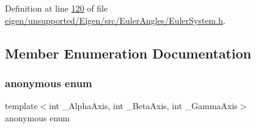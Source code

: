 Definition at line \hyperlink{eigen_2unsupported_2_eigen_2src_2_euler_angles_2_euler_system_8h_source_l00120}{120} of file \hyperlink{eigen_2unsupported_2_eigen_2src_2_euler_angles_2_euler_system_8h_source}{eigen/unsupported/\+Eigen/src/\+Euler\+Angles/\+Euler\+System.\+h}.



\subsection{Member Enumeration Documentation}
\mbox{\label{class_eigen_1_1_euler_system_ab1604e0e8eb9b72fa937236fdb9fd68d}} 
\subsubsection{\texorpdfstring{anonymous enum}{anonymous enum}}
{\footnotesize\ttfamily template$<$int \+\_\+\+Alpha\+Axis, int \+\_\+\+Beta\+Axis, int \+\_\+\+Gamma\+Axis$>$ \\
anonymous enum}

